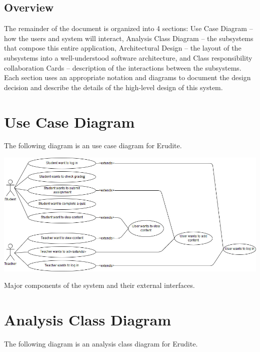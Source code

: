 \documentclass[]{article}
\begin{document}
\subsection{Overview}
\label{sub:overview}
The remainder of the document is organized into 4 sections: Use Case Diagram --
how the users and system will interact, Analysis Class Diagram -- the
subsystems that compose this entire application, Architectural Design -- the
layout of the subsystems into a well-understood software architecture, and
Class responsibility collaboration Cards -- description of the interactions
between the subsystems. Each section uses an appropriate notation and diagrams
to document the design decision and describe the details of the high-level
design of this system.




\newpage

\section{Use Case Diagram}
\label{sec:use_case_diagram}
The following diagram is an use case diagram for Erudite.\\

{
  \centering
    \includegraphics[scale=0.5]{A2_Assets/Use_Case_Diagram_v1.jpg}

  \centerline{Major components of the system and their external interfaces.}
}

\newpage

\section{Analysis Class Diagram}
\label{sec:analysis_class_diagram}
The following diagram is an analysis class diagram for Erudite.\\
\end{document}
